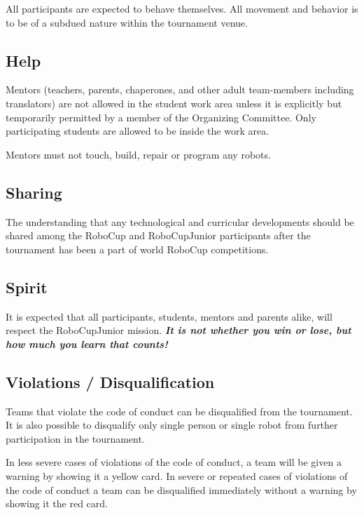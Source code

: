 \documentclass{article}
\begin{document}
All participants are expected to behave themselves. All movement and behavior
is to be of a subdued nature within the tournament venue.

\subsection{ Help \label{ref-043}}

Mentors (teachers, parents, chaperones, and other adult team-members including
translators) are not allowed in the student work area unless it is explicitly
but temporarily permitted by a member of the Organizing Committee. Only
participating students are allowed to be inside the work area.

Mentors must not touch, build, repair or program any robots.

\subsection{ Sharing \label{ref-044}}

The understanding that any technological and curricular developments should be
shared among the RoboCup and RoboCupJunior participants after the tournament
has been a part of world RoboCup competitions.

\subsection{ Spirit \label{ref-045}}

It is expected that all participants, students, mentors and parents alike, will
respect the RoboCupJunior mission. \textbf{\textit{It is not whether you win or
lose, but how much you learn that counts!}}

\subsection{ Violations / Disqualification \label{ref-046}}

Teams that violate the code of conduct can be disqualified from the tournament.
It is also possible to disqualify only single person or single robot from
further participation in the tournament.

In less severe cases of violations of the code of conduct, a team will be given
a warning by showing it a yellow card. In severe or repeated cases of
violations of the code of conduct a team can be disqualified immediately
without a warning by showing it the red card.
\end{document}
